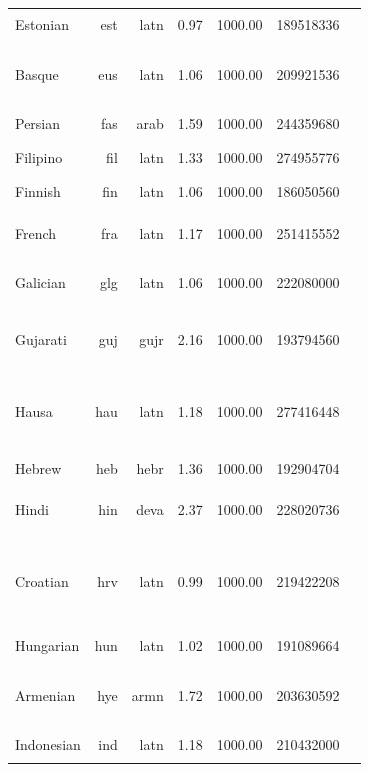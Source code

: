 \documentclass[11pt]{article}
\begin{document}
\begin{center}
\begin{longtable}[width=0.9\textwidth]{|lrrrrrl|}
Estonian & est & latn & 0.97 & 1000.00 & 189518336 & {\color{oscar}\rule{4.0cm}{8pt}} \\ 
Basque & eus & latn & 1.06 & 1000.00 & 209921536 & {\color{oscar}\rule{0.32cm}{8pt}}{\color{madlad400}\rule{2.79cm}{8pt}}{\color{glot500}\rule{0.8900000000000001cm}{8pt}} \\ 
Persian & fas & arab & 1.59 & 1000.00 & 244359680 & {\color{glot500}\rule{4.0cm}{8pt}} \\ 
Filipino & fil & latn & 1.33 & 1000.00 & 274955776 & {\color{madlad400}\rule{4.0cm}{8pt}} \\ 
Finnish & fin & latn & 1.06 & 1000.00 & 186050560 & {\color{oscar}\rule{4.0cm}{8pt}} \\ 
French & fra & latn & 1.17 & 1000.00 & 251415552 & {\color{oscar}\rule{3.99cm}{8pt}}{\color{other}\rule{0.009999999999999787cm}{8pt}} \\ 
Galician & glg & latn & 1.06 & 1000.00 & 222080000 & {\color{oscar}\rule{0.77cm}{8pt}}{\color{glot500}\rule{3.23cm}{8pt}} \\ 
Gujarati & guj & gujr & 2.16 & 1000.00 & 193794560 & {\color{oscar}\rule{0.54cm}{8pt}}{\color{glot500}\rule{3.45cm}{8pt}}{\color{other}\rule{0.009999999999999787cm}{8pt}} \\ 
Hausa & hau & latn & 1.18 & 1000.00 & 277416448 & {\color{nllb}\rule{1.2cm}{8pt}}{\color{madlad400}\rule{1.25cm}{8pt}}{\color{glot500}\rule{1.09cm}{8pt}}{\color{other}\rule{0.45999999999999996cm}{8pt}} \\ 
Hebrew & heb & hebr & 1.36 & 1000.00 & 192904704 & {\color{oscar}\rule{4.0cm}{8pt}}{\color{other}\rule{0.0cm}{8pt}} \\ 
Hindi & hin & deva & 2.37 & 1000.00 & 228020736 & {\color{oscar}\rule{3.99cm}{8pt}}{\color{other}\rule{0.009999999999999787cm}{8pt}} \\ 
Croatian & hrv & latn & 0.99 & 1000.00 & 219422208 & {\color{oscar}\rule{0.08cm}{8pt}}{\color{nllb}\rule{0.72cm}{8pt}}{\color{madlad400}\rule{2.32cm}{8pt}}{\color{glot500}\rule{0.7cm}{8pt}}{\color{other}\rule{0.1800000000000006cm}{8pt}} \\ 
Hungarian & hun & latn & 1.02 & 1000.00 & 191089664 & {\color{oscar}\rule{4.0cm}{8pt}}{\color{other}\rule{0.0cm}{8pt}} \\ 
Armenian & hye & armn & 1.72 & 1000.00 & 203630592 & {\color{oscar}\rule{2.1cm}{8pt}}{\color{nllb}\rule{0.97cm}{8pt}}{\color{glot500}\rule{0.9299999999999997cm}{8pt}} \\ 
Indonesian & ind & latn & 1.18 & 1000.00 & 210432000 & {\color{oscar}\rule{4.0cm}{8pt}}{\color{other}\rule{0.0cm}{8pt}} \\ 

\end{longtable}
\end{center}
\end{document}
